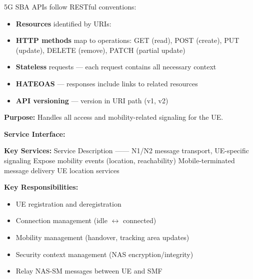 
5G SBA APIs follow RESTful conventions:

\begin{itemize}
\tightlist
\item
  \textbf{Resources} identified by URIs: \allowbreak{}\CNcode{/}\allowbreak{}\allowbreak{}\allowbreak{}\allowbreak{}\allowbreak{}\allowbreak{}\allowbreak{}
\item
  \textbf{HTTP methods} map to operations: GET (read), POST (create), PUT (update), DELETE (remove), PATCH (partial update)
\item
  \textbf{Stateless} requests — each request contains all necessary context
\item
  \textbf{HATEOAS} — responses include links to related resources
\item
  \textbf{API versioning} — version in URI path (v1, v2)
\end{itemize}




\CNchained{}



\textbf{Purpose:} Handles all access and mobility-related signaling for the UE.

\textbf{Service Interface:} 

\textbf{Key Services:}\CNbr{}\textbar{} Service \textbar{} Description \textbar{}\CNbr{}\textbar{}—\textbar{}—\textbar{}\CNbr{}\textbar{}  \textbar{} N1/\allowbreak{}N2 message transport, UE-specific signaling \textbar{}\CNbr{}\textbar{}  \textbar{} Expose mobility events (location, reachability) \textbar{}\CNbr{}\textbar{}  \textbar{} Mobile-terminated message delivery \textbar{}\CNbr{}\textbar{}  \textbar{} UE location services \textbar{}

\textbf{Key Responsibilities:}

\begin{itemize}
\tightlist
\item
  UE registration and deregistration
\item
  Connection management (idle \ensuremath{\leftrightarrow} connected)
\item
  Mobility management (handover, tracking area updates)
\item
  Security context management (NAS encryption/\allowbreak{}integrity)
\item
  Relay NAS-SM messages between UE and SMF
\end{itemize}

